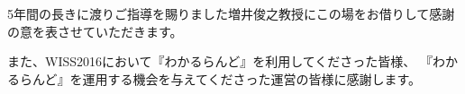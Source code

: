 \begin{acknowledgment}

5年間の長きに渡りご指導を賜りました増井俊之教授にこの場をお借りして感謝の意を表させていただきます。



また、WISS2016において『わかるらんど』を利用してくださった皆様、
『わかるらんど』を運用する機会を与えてくださった運営の皆様に感謝します。

\end{acknowledgment}
